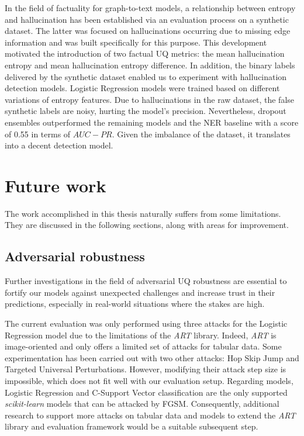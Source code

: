 In the field of factuality for graph-to-text models, a relationship between entropy and hallucination has been established via an evaluation process on a synthetic dataset. The latter was focused on hallucinations occurring due to missing edge information and was built specifically for this purpose. This development motivated the introduction of two factual UQ metrics: the mean hallucination entropy and mean hallucination entropy difference. In addition, the binary labels delivered by the synthetic dataset enabled us to experiment with hallucination detection models. Logistic Regression models were trained based on different variations of entropy features. Due to hallucinations in the raw dataset, the false synthetic labels are noisy, hurting the model's precision. Nevertheless, dropout ensembles outperformed the remaining models and the NER baseline with a score of 0.55 in terms of $AUC-PR$. Given the imbalance of the dataset, it translates into a decent detection model. 


\section{Future work}
The work accomplished in this thesis naturally suffers from some limitations. They are discussed in the following sections, along with areas for improvement.


\subsection{Adversarial robustness}

Further investigations in the field of adversarial UQ robustness are essential to fortify our models against unexpected challenges and increase trust in their predictions, especially in real-world situations where the stakes are high.

The current evaluation was only performed using three attacks for the Logistic Regression model due to the limitations of the \textit{ART} library. Indeed, \textit{ART} is image-oriented and only offers a limited set of attacks for tabular data. Some experimentation has been carried out with two other attacks: Hop Skip Jump\cite{HopSkipJump} and Targeted Universal Perturbations\cite{TargetedUniversalPerturbations}. However, modifying their attack step size is impossible, which does not fit well with our evaluation setup. Regarding models,  Logistic Regression and C-Support Vector classification are the only supported \textit{scikit-learn} models that can be attacked by FGSM. Consequently, additional research to support more attacks on tabular data and models to extend the \textit{ART} library and evaluation framework would be a suitable subsequent step.


